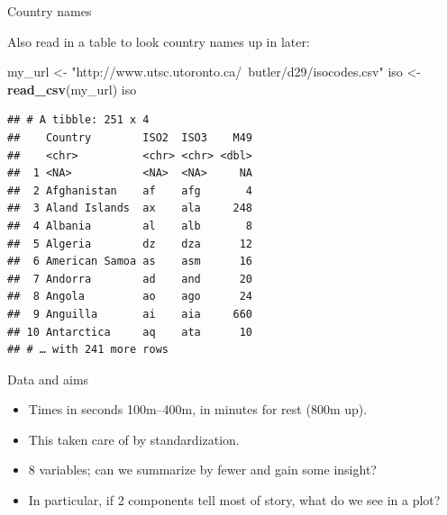\documentclass[ignorenonframetext,]{beamer}
\newenvironment{Shaded}{\begin{snugshade}}{\end{snugshade}}
\newcommand{\KeywordTok}[1]{\textcolor[rgb]{0.13,0.29,0.53}{\textbf{#1}}}
\newcommand{\NormalTok}[1]{#1}
\newcommand{\StringTok}[1]{\textcolor[rgb]{0.31,0.60,0.02}{#1}}
\begin{document}
\begin{frame}[fragile]{Country names}
\protect\hypertarget{country-names}{}

Also read in a table to look country names up in later:

\begin{Shaded}
\begin{Highlighting}[]
\NormalTok{my_url <-}\StringTok{ "http://www.utsc.utoronto.ca/~butler/d29/isocodes.csv"}
\NormalTok{iso <-}\StringTok{ }\KeywordTok{read_csv}\NormalTok{(my_url)}
\NormalTok{iso}
\end{Highlighting}
\end{Shaded}

\begin{verbatim}
## # A tibble: 251 x 4
##    Country        ISO2  ISO3    M49
##    <chr>          <chr> <chr> <dbl>
##  1 <NA>           <NA>  <NA>     NA
##  2 Afghanistan    af    afg       4
##  3 Aland Islands  ax    ala     248
##  4 Albania        al    alb       8
##  5 Algeria        dz    dza      12
##  6 American Samoa as    asm      16
##  7 Andorra        ad    and      20
##  8 Angola         ao    ago      24
##  9 Anguilla       ai    aia     660
## 10 Antarctica     aq    ata      10
## # … with 241 more rows
\end{verbatim}

\end{frame}

\begin{frame}{Data and aims}
\protect\hypertarget{data-and-aims}{}

\begin{itemize}
\item
  Times in seconds 100m--400m, in minutes for rest (800m up).
\item
  This taken care of by standardization.
\item
  8 variables; can we summarize by fewer and gain some insight?
\item
  In particular, if 2 components tell most of story, what do we see in a
  plot?
\end{itemize}

\end{frame}
\end{document}

